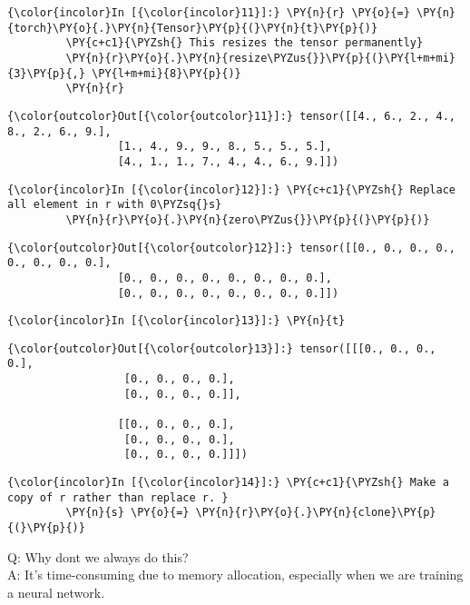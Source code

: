 \begin{Verbatim}[commandchars=\\\{\}]
{\color{incolor}In [{\color{incolor}11}]:} \PY{n}{r} \PY{o}{=} \PY{n}{torch}\PY{o}{.}\PY{n}{Tensor}\PY{p}{(}\PY{n}{t}\PY{p}{)}
         \PY{c+c1}{\PYZsh{} This resizes the tensor permanently}
         \PY{n}{r}\PY{o}{.}\PY{n}{resize\PYZus{}}\PY{p}{(}\PY{l+m+mi}{3}\PY{p}{,} \PY{l+m+mi}{8}\PY{p}{)}  
         \PY{n}{r}
\end{Verbatim}


\begin{Verbatim}[commandchars=\\\{\}]
{\color{outcolor}Out[{\color{outcolor}11}]:} tensor([[4., 6., 2., 4., 8., 2., 6., 9.],
                 [1., 4., 9., 9., 8., 5., 5., 5.],
                 [4., 1., 1., 7., 4., 4., 6., 9.]])
\end{Verbatim}
            
\begin{Verbatim}[commandchars=\\\{\}]
{\color{incolor}In [{\color{incolor}12}]:} \PY{c+c1}{\PYZsh{} Replace all element in r with 0\PYZsq{}s}
         \PY{n}{r}\PY{o}{.}\PY{n}{zero\PYZus{}}\PY{p}{(}\PY{p}{)} 
\end{Verbatim}


\begin{Verbatim}[commandchars=\\\{\}]
{\color{outcolor}Out[{\color{outcolor}12}]:} tensor([[0., 0., 0., 0., 0., 0., 0., 0.],
                 [0., 0., 0., 0., 0., 0., 0., 0.],
                 [0., 0., 0., 0., 0., 0., 0., 0.]])
\end{Verbatim}
            
\begin{Verbatim}[commandchars=\\\{\}]
{\color{incolor}In [{\color{incolor}13}]:} \PY{n}{t}
\end{Verbatim}


\begin{Verbatim}[commandchars=\\\{\}]
{\color{outcolor}Out[{\color{outcolor}13}]:} tensor([[[0., 0., 0., 0.],
                  [0., 0., 0., 0.],
                  [0., 0., 0., 0.]],
         
                 [[0., 0., 0., 0.],
                  [0., 0., 0., 0.],
                  [0., 0., 0., 0.]]])
\end{Verbatim}
         
            
\begin{Verbatim}[commandchars=\\\{\}]
{\color{incolor}In [{\color{incolor}14}]:} \PY{c+c1}{\PYZsh{} Make a copy of r rather than replace r. }
         \PY{n}{s} \PY{o}{=} \PY{n}{r}\PY{o}{.}\PY{n}{clone}\PY{p}{(}\PY{p}{)} 
\end{Verbatim}
 Q: Why don\PYZsq{}t we always do this? \\
 A: It's time-consuming due to memory allocation, especially when we are training a neural network.  


